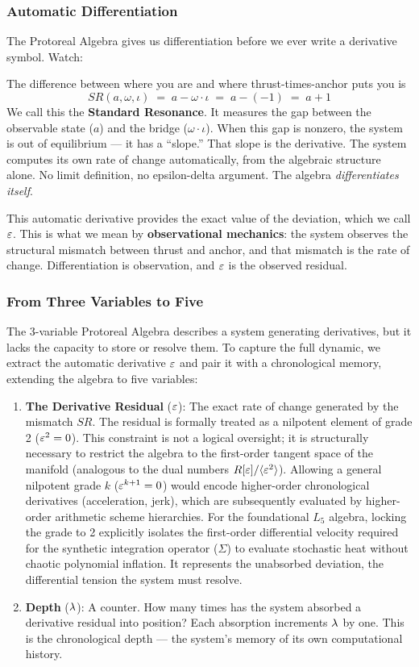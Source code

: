 \subsubsection*{Automatic Differentiation}

The Protoreal Algebra gives us differentiation before we ever write a derivative symbol. Watch:

The difference between where you are and where thrust-times-anchor puts you is
$$SR(a, \omega, \iota) \;=\; a - \omega \cdot \iota \;=\; a - (-1) \;=\; a + 1$$
We call this the \textbf{Standard Resonance}. It measures the gap between the observable state ($a$) and the bridge ($\omega \cdot \iota$). When this gap is nonzero, the system is out of equilibrium --- it has a ``slope.'' That slope is the derivative. The system computes its own rate of change automatically, from the algebraic structure alone. No limit definition, no epsilon-delta argument. The algebra \emph{differentiates itself}.

This automatic derivative provides the exact value of the deviation, which we call $\varepsilon$. This is what we mean by \textbf{observational mechanics}: the system observes the structural mismatch between thrust and anchor, and that mismatch is the rate of change. Differentiation is observation, and $\varepsilon$ is the observed residual.

\subsubsection*{From Three Variables to Five}

The 3-variable Protoreal Algebra describes a system generating derivatives, but it lacks the capacity to store or resolve them. To capture the full dynamic, we extract the automatic derivative $\varepsilon$ and pair it with a chronological memory, extending the algebra to five variables:

\begin{enumerate}
\item \textbf{The Derivative Residual} ($\varepsilon$): The exact rate of change generated by the mismatch $SR$. The residual is formally treated as a nilpotent element of grade 2 ($\varepsilon^2 = 0$). This constraint is not a logical oversight; it is structurally necessary to restrict the algebra to the first-order tangent space of the manifold (analogous to the dual numbers $R[\varepsilon]/\langle\varepsilon^2\rangle$). Allowing a general nilpotent grade $k$ ($\varepsilon^{k+1} = 0$) would encode higher-order chronological derivatives (acceleration, jerk), which are subsequently evaluated by higher-order arithmetic scheme hierarchies. For the foundational $L_5$ algebra, locking the grade to 2 explicitly isolates the first-order differential velocity required for the synthetic integration operator ($\Sigma$) to evaluate stochastic heat without chaotic polynomial inflation. It represents the unabsorbed deviation, the differential tension the system must resolve. 
\item \textbf{Depth} ($\lambda$): A counter. How many times has the system absorbed a derivative residual into position? Each absorption increments $\lambda$ by one. This is the chronological depth --- the system's memory of its own computational history.
\end{enumerate}

